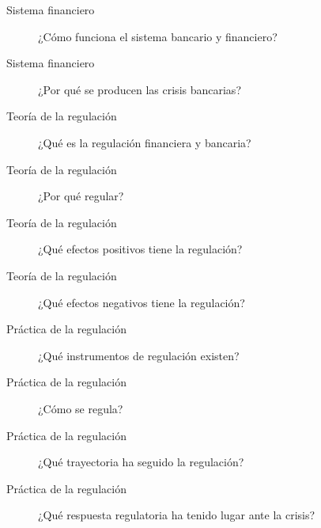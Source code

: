 \documentclass{nuevotema}
\begin{document}
\begin{description}
    \item[Sistema financiero] ¿Cómo funciona el sistema bancario y financiero?
    \item[Sistema financiero] ¿Por qué se producen las crisis bancarias?
    
    \item[Teoría de la regulación] ¿Qué es la regulación financiera y bancaria?
    \item[Teoría de la regulación] ¿Por qué regular?
    \item[Teoría de la regulación] ¿Qué efectos positivos tiene la regulación?
    \item[Teoría de la regulación] ¿Qué efectos negativos tiene la regulación?
    
    \item[Práctica de la regulación] ¿Qué instrumentos de regulación existen?
    \item[Práctica de la regulación] ¿Cómo se regula?
    \item[Práctica de la regulación] ¿Qué trayectoria ha seguido la regulación?
    \item[Práctica de la regulación] ¿Qué respuesta regulatoria ha tenido lugar ante la crisis?
\end{description}

\esquemacorto
\end{document}
